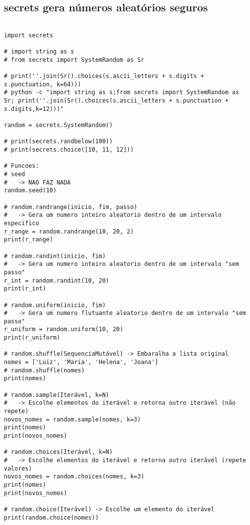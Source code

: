 \documentclass{article}
\begin{document}
\subsection{secrets gera números aleatórios seguros}
\begin{lstlisting}
    
import secrets

# import string as s
# from secrets import SystemRandom as Sr

# print(''.join(Sr().choices(s.ascii_letters + s.digits + s.punctuation, k=64)))
# python -c "import string as s;from secrets import SystemRandom as Sr; print(''.join(Sr().choices(s.ascii_letters + s.punctuation + s.digits,k=12)))"

random = secrets.SystemRandom()

# print(secrets.randbelow(100))
# print(secrets.choice([10, 11, 12]))

# Funcoes:
# seed
#   -> NAO FAZ NADA
random.seed(10)

# random.randrange(inicio, fim, passo)
#   -> Gera um numero inteiro aleatorio dentro de um intervalo especifico
r_range = random.randrange(10, 20, 2)
print(r_range)

# random.randint(inicio, fim)
#   -> Gera um numero inteiro aleatorio dentro de um intervalo "sem passo"
r_int = random.randint(10, 20)
print(r_int)

# random.uniform(inicio, fim)
#   -> Gera um numero flutuante aleatorio dentro de um intervalo "sem passo"
r_uniform = random.uniform(10, 20)
print(r_uniform)

# random.shuffle(SequenciaMutável) -> Embaralha a lista original
nomes = ['Luiz', 'Maria', 'Helena', 'Joana']
# random.shuffle(nomes)
print(nomes)

# random.sample(Iterável, k=N)
#   -> Escolhe elementos do iterável e retorna outro iterável (não repete)
novos_nomes = random.sample(nomes, k=3)
print(nomes)
print(novos_nomes)

# random.choices(Iterável, k=N)
#   -> Escolhe elementos do iterável e retorna outro iterável (repete valores)
novos_nomes = random.choices(nomes, k=3)
print(nomes)
print(novos_nomes)

# random.choice(Iterável) -> Escolhe um elemento do iterável
print(random.choice(nomes))
\end{lstlisting}
\end{document}
